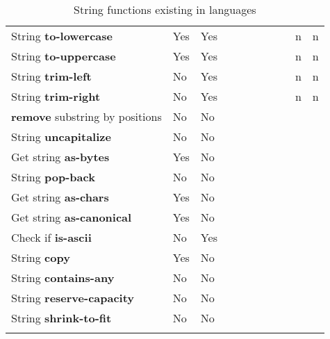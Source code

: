 \documentclass[anonymous,sigplan,review,11pt,nonacm,natbib=false]{acmart}
\begin{document}
\begin{longtable}{lllllllllll}
        String \textbf{to-lowercase} & Yes & Yes &  &  &  & &  &  & n & n \\

        String \textbf{to-uppercase} & Yes & Yes &  &  &  & &  &  & n & n \\

        String \textbf{trim-left} & No & Yes &  &  &  &  &  &  & n & n \\

        String \textbf{trim-right} & No & Yes &  &  &  & &  &  & n & n \\

        \textbf{remove} substring by positions & No & No &  &  &  & &  &  &  & \\

        String \textbf{uncapitalize} & No & No &  &  &  & &  &  &  & \\

        Get string \textbf{as-bytes} & Yes & No &  &  &  & &  &  &  & \\

        String \textbf{pop-back} & No & No &  &  &  & &  &  &  & \\

        Get string \textbf{as-chars} & Yes & No &  &  &  & &  &  &  & \\

        Get string \textbf{as-canonical} & Yes & No &  &  &  & &  &  &  & \\

        Check if \textbf{is-ascii} & No & Yes &  &  &  & &  &  &  & \\

        String \textbf{copy} & Yes & No &  &  &  & &  &  &  & \\

        String \textbf{contains-any} & No & No &  &  &  & &  &  &  & \\

        String \textbf{reserve-capacity} & No & No &  &  &  & &  &  &  & \\

        String \textbf{shrink-to-fit} & No & No &  &  &  & &  &  &  & \\ \hline
        \caption{String functions existing in languages}
        \label{tab:my_label}
    \end{longtable}

    \printbibliography
\end{document}
